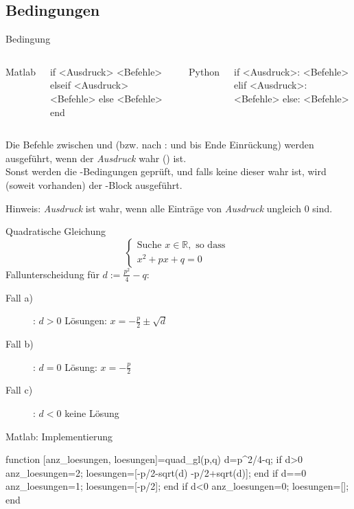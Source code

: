 \documentclass[hyperref={xetex}]{beamer}
\begin{document}
\subsection{Bedingungen}
%
%
%
\begin{frame}[fragile]{Bedingung}
\begin{columns}[t,onlytextwidth]
Matlab
\begin{matlabin}
if  <Ausdruck>
   <Befehle>
elseif <Ausdruck>
  <Befehle>
else
   <Befehle>
end
\end{matlabin}
Python
\begin{pyin}
if <Ausdruck>:
  <Befehle>
elif <Ausdruck>:
  <Befehle>
else:
  <Befehle>
\end{pyin}
\end{columns}
  \begin{pyin}
\end{pyin}

Die Befehle zwischen  und  (bzw. nach : und bis Ende Einrückung) werden ausgeführt, wenn
der \textit{Ausdruck} wahr () ist.\\
Sonst werden die -Bedingungen geprüft, und falls keine dieser wahr ist, wird (soweit vorhanden) der -Block ausgeführt.

\alert{Hinweis}: \textit{Ausdruck} ist wahr, wenn   alle Einträge von \textit{Ausdruck} ungleich $0$ sind.
\end{frame}
%
%
%
\begin{frame}[fragile]{Quadratische Gleichung}
\alert{ \[  \left\{ \begin{array}{l} \mbox{Suche }  x \in \mathbb{R},
 \mbox{ so dass } \\
 x^2+px +q =0  \end{array} \right. \]}
Fallunterscheidung für $d:=\frac{p^2}{4} -q$:
\begin{description}
\item [Fall a)]: \alert{ $d>0$}  Lösungen: $x=-\frac{p}{2} \pm \sqrt{d}$ \\
\item [Fall b)]: \alert{ $d=0$}  Lösung: $x=-\frac{p}{2}$\\
\item [Fall c)]: \alert{ $d<0$} \quad keine Lösung
\end{description}
\end{frame} 
%
%
%
\begin{frame}[fragile]{Matlab: Implementierung}
\begin{matlabin}
function [anz_loesungen, loesungen]=quad_gl(p,q)
d=p^2/4-q; %
if d>0 
    anz_loesungen=2;
    loesungen=[-p/2-sqrt(d) -p/2+sqrt(d)];
end
if d==0 
    anz_loesungen=1;
    loesungen=[-p/2];
end
if d<0 
    anz_loesungen=0;
    loesungen=[];
end
\end{matlabin}
\end{frame}
\end{document}
